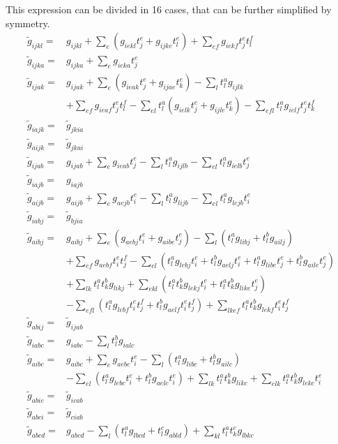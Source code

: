 This expression can be divided in 16 cases, that can be further simplified by symmetry.
\begin{align}
  {\tilde g}_{ijkl}=&g_{ijkl}+\sum_{e}(g_{iekl}t_j^e+g_{ijke}t_l^e)+\sum_{ef}g_{iekf}t_j^et_l^f\label{eq:t1g_ijkl}\\
  {\tilde g}_{ijka}=&g_{ijka}+\sum_{e}g_{ieka}t_j^e\label{eq:t1g_ijka}\\ 
  {\tilde g}_{ijak}=&g_{ijak}+\sum_{e}(g_{ieak}t_j^e+g_{ijae}t_k^e)-\sum_lt_l^ag_{ijlk}\nonumber\\
  &+\sum_{ef}g_{ieaf}t_j^et_l^f-\sum_{el}t_l^a(g_{ielk}t_j^e+g_{ijle}t_k^e)-\sum_{efl}t_l^ag_{ielf}t_j^et_k^f\label{eq:t1g_ijak}\\
  {\tilde g}_{iajk}=&{\tilde g}_{jkia}\label{eq:t1g_iajk}\\
  {\tilde g}_{aijk}=&{\tilde g}_{jkai}\label{eq:t1g_aijk}\\
  {\tilde g}_{ijab}=&g_{ijab}+\sum_{e}g_{ieab}t_j^e-\sum_{l}t_l^ag_{ijlb}-\sum_{el}t_l^ag_{ielb}t_j^e\label{eq:t1g_ijab}\\
  {\tilde g}_{iajb}=&g_{iajb}\label{eq:t1g_iajb}\\
  {\tilde g}_{aijb}=&g_{aijb}+\sum_{e}g_{aejb}t_i^e-\sum_{l}t_l^ag_{lijb}-\sum_{el}t_l^ag_{lejb}t_i^e\label{eq:t1g_aijb}\\
  {\tilde g}_{iabj}=&{\tilde g}_{bjia}\label{eq:t1g_iabj}\\
  {\tilde g}_{aibj}=&g_{aibj}+\sum_{e}(g_{aebj}t_i^e+g_{aibe}t_j^e)-\sum_{l}(t_l^ag_{libj}+t_l^bg_{ailj})\nonumber\\
  &+\sum_{ef}g_{aebf}t_i^et_j^f-\sum_{el}(t_l^ag_{lebj}t_i^e+t_l^bg_{aelj}t_i^e+t_l^ag_{libe}t_j^e+t_l^bg_{aile}t_j^e)\nonumber\\
  &+\sum_{lk}t_l^at_k^bg_{likj}+\sum_{ekl}(t_l^at_k^bg_{lekj}t_i^e+t_l^at_k^bg_{like}t_j^e)\nonumber\\
  &-\sum_{efl}(t_l^ag_{lebf}t_i^et_j^f+t_l^bg_{aelf}t_i^et_j^f)+\sum_{lkef}t_l^at_k^bg_{lekf}t_i^et_j^f\label{eq:t1g_aibj}\\
  {\tilde g}_{abij}=&{\tilde g}_{ijab}\label{eq:t1g_abij}\\
  {\tilde g}_{iabc}=&g_{iabc}-\sum_{l}t_l^bg_{ialc}\label{eq:t1g_iabc}\\
  {\tilde g}_{aibc}=&g_{aibc}+\sum_{e}g_{aebc}t_i^e-\sum_l(t_l^ag_{libc}+t_l^bg_{ailc})\nonumber\\
  &-\sum_{el}(t_l^ag_{lebc}t_i^e+t_l^bg_{aelc}t_i^e)+\sum_{lk}t_l^at_k^bg_{likc}+\sum_{elk}t_l^at_k^bg_{lekc}t_i^e\label{eq:t1g_aibc}\\
  {\tilde g}_{abic}=&{\tilde g}_{icab}\label{eq:t1g_abic}\\
  {\tilde g}_{abci}=&{\tilde g}_{ciab}\label{eq:t1g_abci}\\
  {\tilde g}_{abcd}=&g_{abcd}-\sum_l(t_l^ag_{lbcd}+t_l^cg_{abld})+\sum_{kl}t_l^at_k^cg_{lbkc}\label{eq:t1g_abcd}
\end{align}

